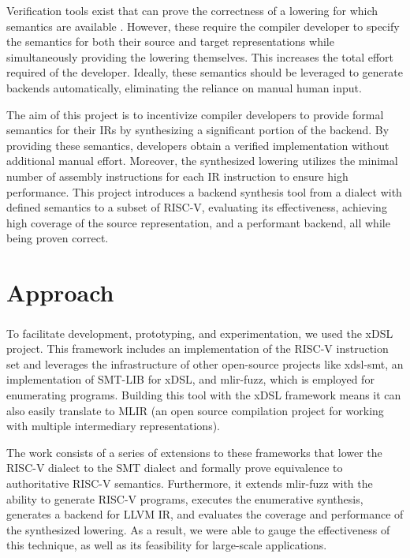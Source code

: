Verification tools exist that can prove the correctness of a lowering for 
which semantics are available \cite{smt-mlir}. However, these require the compiler 
developer to specify the semantics for both their source and target representations while 
simultaneously providing the lowering themselves. This increases the total effort 
required of the developer. Ideally, these semantics should be leveraged to generate 
backends automatically, eliminating the reliance on manual human input.

The aim of this project is to incentivize compiler developers to provide formal 
semantics for their IRs by synthesizing a significant portion of the backend. By 
providing these semantics, developers obtain a verified implementation without 
additional manual effort. Moreover, the synthesized lowering utilizes the minimal 
number of assembly instructions for each IR instruction to ensure high performance.
%
This project introduces a backend synthesis tool from a dialect with defined semantics 
to a subset of RISC-V, evaluating its effectiveness, achieving high coverage of the source 
representation, and a performant backend, all while being proven correct.


\section{Approach}

To facilitate development, prototyping, and experimentation, we used the 
xDSL\textsuperscript{\cite{xdsl-smt}} project. This framework includes an 
implementation of the RISC-V instruction set and leverages the infrastructure of other
open-source projects like xdsl-smt, an implementation of SMT-LIB for xDSL, and mlir-fuzz, which is 
employed for enumerating programs. Building this tool with the xDSL framework means it 
can also easily translate to MLIR (an open source compilation project for working with 
multiple intermediary representations).

The work consists of a series of extensions to these frameworks that 
lower the RISC-V dialect to the SMT dialect and formally prove equivalence to 
authoritative RISC-V semantics. Furthermore, it extends mlir-fuzz with the ability to generate 
RISC-V programs, executes the enumerative synthesis, generates a backend for LLVM IR, 
and evaluates the coverage and performance of the synthesized lowering.
%
As a result, we were able to gauge the effectiveness of this technique, as well 
as its feasibility for large-scale applications.

